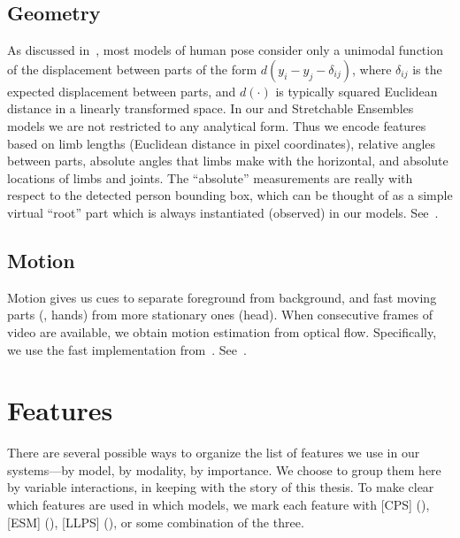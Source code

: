 \section{Geometry}\label{sec:geom}
As discussed in~, most models of human pose consider only a unimodal 
function of the displacement between parts of the form $d(y_i - y_j - 
\delta_{ij})$, where $\delta_{ij}$ is the expected displacement between parts, 
and $d(\cdot)$ is typically squared Euclidean distance in a linearly 
transformed space.  In our \CPS and Stretchable Ensembles models we are not restricted to any analytical form.  
Thus we encode features based on limb lengths (Euclidean distance in pixel 
coordinates), relative angles between parts, absolute angles that limbs make 
with the horizontal, and absolute locations of limbs and joints.  The 
``absolute'' measurements are really with respect to the detected person 
bounding box, which can be thought of as a simple virtual ``root'' part which 
is always instantiated (observed) in our models.  
See~.

\section{Motion}\label{sec:motion} Motion gives us cues to separate foreground 
from background, and fast moving parts (\eg, hands) from more stationary ones 
(\eg head).  When consecutive frames of video are available, we obtain motion 
estimation from optical flow.  Specifically, we use the fast implementation 
from~\citet{liu-optflow}.  See~.




\chapter{Features}

There are several possible ways to organize the list of features we use in our 
systems---by model, by modality, by importance.  We choose to group them 
here by variable interactions, in keeping with the story of this thesis.  To 
make clear which features are used in which models, we mark each feature with 
[CPS] (), [ESM] (), [LLPS] (), or 
some combination of the three.

